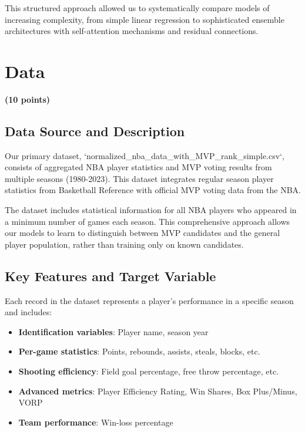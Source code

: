 \documentclass[10pt,twocolumn,letterpaper]{article}
\begin{document}
This structured approach allowed us to systematically compare models of increasing complexity, from simple linear regression to sophisticated ensemble architectures with self-attention mechanisms and residual connections.

\section{Data}
\textbf{(10 points)}

\subsection{Data Source and Description}

Our primary dataset, `normalized_nba_data_with_MVP_rank_simple.csv`, consists of aggregated NBA player statistics and MVP voting results from multiple seasons (1980-2023). This dataset integrates regular season player statistics from Basketball Reference with official MVP voting data from the NBA.

The dataset includes statistical information for all NBA players who appeared in a minimum number of games each season. This comprehensive approach allows our models to learn to distinguish between MVP candidates and the general player population, rather than training only on known candidates.

\subsection{Key Features and Target Variable}

Each record in the dataset represents a player's performance in a specific season and includes:

\begin{itemize}
    \item \textbf{Identification variables}: Player name, season year
    \item \textbf{Per-game statistics}: Points, rebounds, assists, steals, blocks, etc.
    \item \textbf{Shooting efficiency}: Field goal percentage, free throw percentage, etc.
    \item \textbf{Advanced metrics}: Player Efficiency Rating, Win Shares, Box Plus/Minus, VORP
    \item \textbf{Team performance}: Win-loss percentage
\end{itemize}
\end{document}
